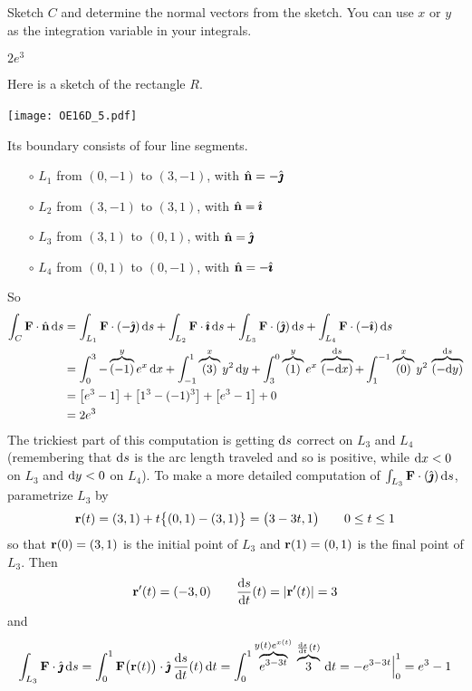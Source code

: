 \begin{hint} 
Sketch $C$ and determine the normal vectors from the sketch. You can use $x$ or $y$ as the integration variable in your 
           integrals.
\end{hint}

\begin{answer} 
$2e^3$
\end{answer}

\begin{solution} 
Here is a sketch of the rectangle $R$.

\begin{center}
     \texttt{[image: OE16D\_5.pdf]}\
\end{center}

Its boundary consists of four line segments.
\begin{itemize}\itemsep1pt \parskip0pt  %
\item[$\circ$]
$L_1$ from $(0,-1)$ to $(3,-1)$, with $\hat{\mathbf{n}} = -\hat{\pmb{\jmath}}$
\item[$\circ$]
$L_2$ from $(3,-1)$ to $(3,1)$, with $\hat{\mathbf{n}} = \hat{\pmb{\imath}}$
\item[$\circ$]
$L_3$ from $(3,1)$ to $(0,1)$, with $\hat{\mathbf{n}} = \hat{\pmb{\jmath}}$
\item[$\circ$]
$L_4$ from $(0,1)$ to $(0,-1)$, with $\hat{\mathbf{n}} = -\hat{\pmb{\imath}}$
\end{itemize}
So
\begin{align*}
\int_C \mathbf{F}\cdot\hat{\mathbf{n}}\,\mathrm{d}s
&= \int_{L_1} \mathbf{F}\cdot(-\hat{\pmb{\jmath}})\,\mathrm{d}s
   +\int_{L_2} \mathbf{F}\cdot \hat{\pmb{\imath}}\,\mathrm{d}s
   +\int_{L_3} \mathbf{F}\cdot(\hat{\pmb{\jmath}})\,\mathrm{d}s
   +\int_{L_4} \mathbf{F}\cdot(-\hat{\pmb{\imath}})\,\mathrm{d}s \\
&= \int_0^3  -\overbrace{(-1)}^{y}e^x\,\mathrm{d}x
   +\int_{-1}^1  \overbrace{(3)}^{x}y^2\,\mathrm{d}y
   +\int^0_3  \overbrace{(1)}^{y}e^x\,\overbrace{(-\mathrm{d}x)}^{\mathrm{d}s}
   +\int^{-1}_1  \overbrace{(0)}^{x}y^2\,\overbrace{(-\mathrm{d}y)}^{\mathrm{d}s} \\
&=\big[e^3-1\big]+\big[1^3-(-1)^3\big] + \big[e^3-1\big]+0 \\
&=2e^3
\end{align*}
The trickiest part of this computation is getting $\mathrm{d}s$ correct on
$L_3$ and $L_4$ (remembering that $\mathrm{d}s$ is the arc length traveled
and so is positive, while $\mathrm{d}x<0$ on $L_3$ and $\mathrm{d}y<0$ on $L_4$).
To make a more detailed computation of $\int_{L_3} \mathbf{F}\cdot(\hat{\pmb{\jmath}})\,\mathrm{d}s$,
parametrize $L_3$ by
\begin{equation*}
\mathbf{r}(t) = (3,1) + t\big\{(0,1)-(3,1)\big\}
       = \big(3-3t,1\big)\qquad
0\le t\le 1
\end{equation*}
so that $\mathbf{r}(0) = (3,1)$ is the initial point of $L_3$ and
$\mathbf{r}(1) = (0,1)$ is the final point of $L_3$. Then
\begin{equation*}
\vr'(t) = (-3,0)\qquad
\diff{s}{t}(t) = |\vr'(t)| = 3
\end{equation*}
and
\begin{align*}
\int_{L_3} \vF\cdot \hj\,\dee{s}
=\int_0^1 \vF\big(\vr(t)\big)\cdot \hj\,\diff{s}{t}(t)\,\dee{t}
=\int_0^1\overbrace{e^{3-3t}}^{y(t)e^{x(t)}}\,
\overbrace{3}^{\diff{s}{t}(t)}\,\dee{t}
=-e^{3-3t}\Big|_0^1
=e^3-1
\end{align*}
\end{solution}


